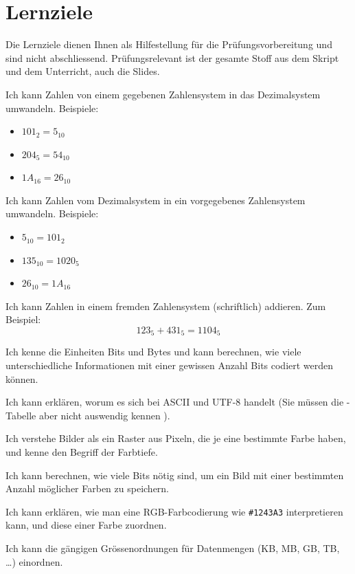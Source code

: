 \chapter{Lernziele}
Die Lernziele dienen Ihnen als Hilfestellung für die Prüfungsvorbereitung und sind nicht abschliessend. Prüfungsrelevant ist der gesamte Stoff aus dem Skript und dem Unterricht, auch die Slides.

\begin{todolist}
    \item Ich kann Zahlen von einem gegebenen Zahlensystem in das Dezimalsystem umwandeln. Beispiele:
    \begin{itemize}
        \item $101_2 = 5_{10}$
        \item $204_5 = 54_{10}$
        \item $1A_{16} = 26_{10}$
    \end{itemize}
    \item Ich kann Zahlen vom Dezimalsystem in ein vorgegebenes Zahlensystem umwandeln. Beispiele:
    \begin{itemize}
        \item $5_{10} = 101_2$
        \item $135_{10}=1020_5$
        \item $26_{10}=1A_{16}$
    \end{itemize}
    \item Ich kann Zahlen in einem fremden Zahlensystem (schriftlich) addieren. Zum Beispiel:
    \[123_5 + 431_5 = 1104_5\]
    \item Ich kenne die Einheiten Bits und Bytes und kann berechnen, wie viele unterschiedliche Informationen mit einer gewissen Anzahl Bits codiert werden können.
    \item Ich kann erklären, worum es sich bei \gls{ASCII} und \gls{UTF-8} handelt (Sie müssen die -Tabelle aber nicht auswendig kennen ).
    \item Ich verstehe Bilder als ein Raster aus Pixeln, die je eine bestimmte Farbe haben, und kenne den Begriff der Farbtiefe.
    \item Ich kann berechnen, wie viele Bits nötig sind, um ein Bild mit einer bestimmten Anzahl möglicher Farben zu speichern.
    \item Ich kann erklären, wie man eine \gls{RGB}-Farbcodierung wie \texttt{\#1243A3} interpretieren kann, und diese einer Farbe zuordnen.
    \item Ich kann die gängigen Grössenordnungen für Datenmengen (KB, MB, GB, TB, \ldots) einordnen.

\end{todolist}
